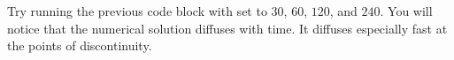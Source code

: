 Try running the previous code block with  set to $30$, $60$, $120$, and $240$.
You will notice that the numerical solution diffuses with time.
It diffuses especially fast at the points of discontinuity.

